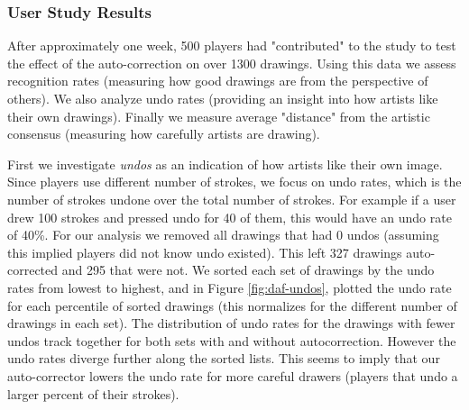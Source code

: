 \subsubsection {User Study Results}

After approximately one week, 500 players had "contributed" to the study to test the effect of the auto-correction on over 1300 drawings. Using this data we assess recognition rates (measuring how good drawings are from the perspective of others). We also analyze undo rates (providing an insight into how artists like their own drawings). Finally we measure average "distance" from the artistic consensus (measuring how carefully artists are drawing).



First we investigate {\em undos} as an indication of how artists like their own image. Since players use different number
of strokes, we focus on undo rates, which is the number of strokes undone over the total number of strokes. For example if
a user drew 100 strokes and pressed undo for 40 of them, this would have an undo rate of 40\%. For our analysis we removed
all drawings that had 0 undos (assuming this implied players did not know undo existed). This left 327 drawings auto-
corrected and 295 that were not. We sorted each set of drawings by the undo rates from lowest to highest, and in Figure
\ref{fig:daf-undos}, plotted the undo rate for each percentile of sorted drawings (this normalizes for the different
number of drawings in each set). The distribution of undo rates for the drawings with fewer undos track together for both
sets with and without autocorrection. However the undo rates diverge further along the sorted lists. This seems to imply
that our auto-corrector lowers the undo rate for more careful drawers (players that undo a larger percent of their
strokes).

